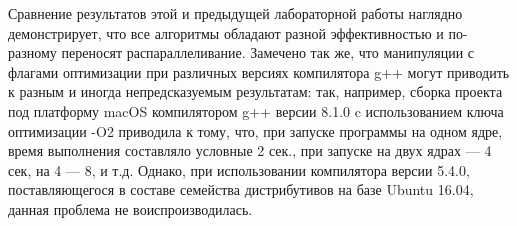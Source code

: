 \documentclass[13pt]{article}
\begin{document}
	Сравнение результатов этой и предыдущей лабораторной работы наглядно демонстрирует, что все алгоритмы обладают разной эффективностью и по-разному переносят распараллеливание. Замечено так же, что манипуляции с флагами оптимизации при различных версиях компилятора g++ могут приводить к разным и иногда непредсказуемым результатам: так, например, сборка проекта под платформу macOS компилятором g++ версии 8.1.0 c использованием ключа оптимизации -O2 приводила к тому, что, при запуске программы на одном ядре, время выполнения составляло условные 2 сек., при запуске на двух ядрах — 4 сек, на 4 — 8, и т.д. Однако, при использовании компилятора версии 5.4.0, поставляющегося в составе семейства дистрибутивов на базе Ubuntu 16.04, данная проблема не воиспроизводилась.
\end{document}

